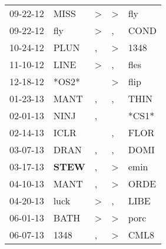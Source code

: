 \begin{supertabular}{p{0.07\textwidth}p{0.06\textwidth}p{0.02\textwidth}p{0.02\textwidth}p{0.06\textwidth}}
          09-22-12\textsuperscript{} &           MISS\textsuperscript{} &     \textgreater &     \textgreater &            fly\textsuperscript{} \\
          09-22-12\textsuperscript{} &            fly\textsuperscript{} &     \textgreater &                , &           COND\textsuperscript{} \\
          10-24-12\textsuperscript{} &           PLUN\textsuperscript{} &                , &     \textgreater &           1348\textsuperscript{} \\
          11-10-12\textsuperscript{} &           LINE\textsuperscript{} &     \textgreater &                , &           fles\textsuperscript{} \\
          12-18-12\textsuperscript{} &                            *OS2* &                  &     \textgreater &           flip\textsuperscript{} \\
          01-23-13\textsuperscript{} &           MANT\textsuperscript{} &                , &                , &           THIN\textsuperscript{} \\
          02-01-13\textsuperscript{} &           NINJ\textsuperscript{} &                , &                  &                            *CS1* \\
          02-14-13\textsuperscript{} &           ICLR\textsuperscript{} &                  &                , &           FLOR\textsuperscript{} \\
          03-07-13\textsuperscript{} &           DRAN\textsuperscript{} &                , &                , &           DOMI\textsuperscript{} \\
          03-17-13\textsuperscript{} &  \textbf{STEW\textsuperscript{}} &                , &     \textgreater &           emin\textsuperscript{} \\
          04-10-13\textsuperscript{} &           MANT\textsuperscript{} &                , &     \textgreater &           ORDE\textsuperscript{} \\
          04-20-13\textsuperscript{} &           luck\textsuperscript{} &     \textgreater &                , &           LIBE\textsuperscript{} \\
          06-01-13\textsuperscript{} &           BATH\textsuperscript{} &     \textgreater &     \textgreater &           porc\textsuperscript{} \\
          06-07-13\textsuperscript{} &           1348\textsuperscript{} &                , &     \textgreater &           CML8\textsuperscript{} \\

\end{supertabular}
